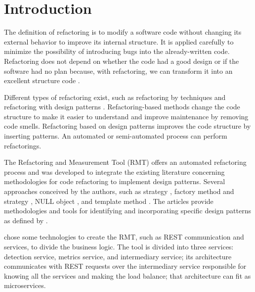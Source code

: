 \chapter{Introduction}%
\label{chpt-intro}

The definition of refactoring is to modify a software code without changing its external behavior to improve its internal structure. It is applied carefully to minimize the possibility of introducing bugs into the already-written code. Refactoring does not depend on whether the code had a good design or if the software had no plan because, with refactoring, we can transform it into an excellent structure code \cite{fowler2018refactoring}.

Different types of refactoring exist, such as refactoring by techniques \cite{fowler2018refactoring} and refactoring with design patterns \cite{kerievsky2005refactoring}. Refactoring-based methods change the code structure to make it easier to understand and improve maintenance by removing code smells. Refactoring based on design patterns improves the code structure by inserting patterns. An automated or semi-automated process can perform refactorings.

The Refactoring and Measurement Tool (RMT) \textcite{beluzzo2018abordagem} offers an automated refactoring process and was developed to integrate the existing literature concerning methodologies for code refactoring to implement design patterns. Several approaches conceived by the authors, such as strategy \cite{CHRISTOPOULOU20121201}, factory method and strategy \cite{liu2014automated}, NULL object \cite{GAITANI201533}, and template method \cite{zafeiris2017automated}. The articles provide methodologies and tools for identifying and incorporating specific design patterns as defined by \textcite{Gamma2009}.

\textcite{beluzzo2018abordagem} chose some technologies to create the RMT, such as REST communication and services, to divide the business logic. The tool is divided into three services: detection service, metrics service, and intermediary service; its architecture communicates with REST requests over the intermediary service responsible for knowing all the services and making the load balance; that architecture can fit as microservices.


